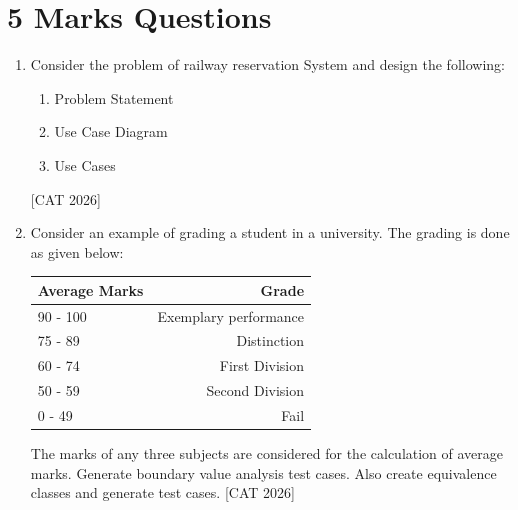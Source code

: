 \documentclass[12pt,a4paper]{article}
\begin{document}
\section{5 Marks Questions}
\begin{enumerate}
    \item Consider the problem of railway reservation System and design the following:
    \begin{enumerate}
        \item Problem Statement
        \item Use Case Diagram
        \item Use Cases
    \end{enumerate}
    \hfill [CAT 2026]
    
\item Consider an example of grading a student in a university. The grading is done as given below:


\begin{tabular}{|l|r|}
  \hline
  Average Marks   & Grade \\
  \hline
  90 - 100  & Exemplary performance \\
  \hline
  75 - 89 & Distinction \\
  \hline
  60 - 74 & First Division \\
  \hline
  50 - 59 & Second Division \\
  \hline
  0 - 49 & Fail \\
  \hline
\end{tabular}

The marks of any three subjects are considered for the calculation of average marks. Generate boundary value analysis test cases. Also create equivalence classes and generate test cases.
\hfill [CAT 2026]
\end{enumerate}
\end{document}
